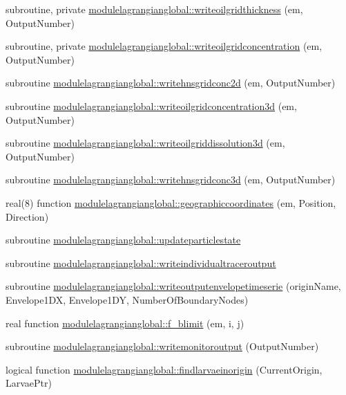 \begin{DoxyCompactItemize}
subroutine, private \mbox{\hyperlink{namespacemodulelagrangianglobal_a388d34c449f0175617349ab4081a3dd4}{modulelagrangianglobal\+::writeoilgridthickness}} (em, Output\+Number)
\item 
subroutine, private \mbox{\hyperlink{namespacemodulelagrangianglobal_a82208b2a591060e1fa3a3e0726bfe869}{modulelagrangianglobal\+::writeoilgridconcentration}} (em, Output\+Number)
\item 
subroutine \mbox{\hyperlink{namespacemodulelagrangianglobal_abb393e682c261146ef53a65a75c60c4a}{modulelagrangianglobal\+::writehnsgridconc2d}} (em, Output\+Number)
\item 
subroutine \mbox{\hyperlink{namespacemodulelagrangianglobal_ab2996daa63e4058df80e1dc7894c41af}{modulelagrangianglobal\+::writeoilgridconcentration3d}} (em, Output\+Number)
\item 
subroutine \mbox{\hyperlink{namespacemodulelagrangianglobal_ac2eff795bcd9d725896afa0d50c89794}{modulelagrangianglobal\+::writeoilgriddissolution3d}} (em, Output\+Number)
\item 
subroutine \mbox{\hyperlink{namespacemodulelagrangianglobal_a94325a61c883247ceef185733a82f5d2}{modulelagrangianglobal\+::writehnsgridconc3d}} (em, Output\+Number)
\item 
real(8) function \mbox{\hyperlink{namespacemodulelagrangianglobal_ab37072f11c5d0760a6306426f0173b84}{modulelagrangianglobal\+::geographiccoordinates}} (em, Position, Direction)
\item 
subroutine \mbox{\hyperlink{namespacemodulelagrangianglobal_ab509b6f03f7bc88920c0f876849e0b4e}{modulelagrangianglobal\+::updateparticlestate}}
\item 
subroutine \mbox{\hyperlink{namespacemodulelagrangianglobal_adbd561b298718cf3849462a24cca974e}{modulelagrangianglobal\+::writeindividualtraceroutput}}
\item 
subroutine \mbox{\hyperlink{namespacemodulelagrangianglobal_a730caaa1e8cb909c0d86b6d7c081175c}{modulelagrangianglobal\+::writeoutputenvelopetimeserie}} (origin\+Name, Envelope1\+DX, Envelope1\+DY, Number\+Of\+Boundary\+Nodes)
\item 
real function \mbox{\hyperlink{namespacemodulelagrangianglobal_ae741ac31795a4ede3b77f20ffacd71c0}{modulelagrangianglobal\+::f\+\_\+blimit}} (em, i, j)
\item 
subroutine \mbox{\hyperlink{namespacemodulelagrangianglobal_ab46abe813f09e4d8299d7750b21814d7}{modulelagrangianglobal\+::writemonitoroutput}} (Output\+Number)
\item 
logical function \mbox{\hyperlink{namespacemodulelagrangianglobal_a0358a516f0009b4fbeb3513332511d63}{modulelagrangianglobal\+::findlarvaeinorigin}} (Current\+Origin, Larvae\+Ptr)

\end{DoxyCompactItemize}

